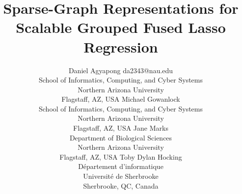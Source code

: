 \documentclass[twoside,11pt]{article}
\begin{document}
\title{Sparse-Graph Representations for Scalable Grouped Fused Lasso Regression}

\author{\name Daniel Agyapong \email da2343@nau.edu \\
       \addr School of Informatics, Computing, and Cyber Systems\\
       Northern Arizona University\\
       Flagstaff, AZ, USA
       \AND
       \name Michael Gowanlock \\
       \addr School of Informatics, Computing, and Cyber Systems\\
       Northern Arizona University\\
       Flagstaff, AZ, USA
       \AND
       \name Jane Marks \\
       \addr Department of Biological Sciences\\
       Northern Arizona University\\
       Flagstaff, AZ, USA
       \AND
       \name Toby Dylan Hocking \\
       \addr D\'epartement d'informatique\\
       Universit\'e de Sherbrooke\\
       Sherbrooke, QC, Canada}

\editor{}

\maketitle
\end{document}
